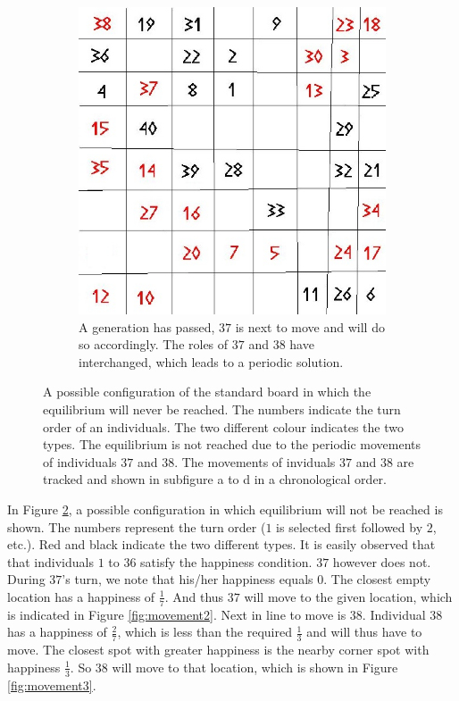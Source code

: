\begin{figure}[H]
\begin{subfigure}{0.3\textwidth}
        \includegraphics[width=\textwidth]{segregation_tegenvb_3.jpg}
        \caption{A generation has passed, $37$ is next to move and will do so accordingly. The roles of  $37$ and $38$ have interchanged, which leads to a periodic solution. }
        \label{fig:movement4}
    \end{subfigure}
    \caption{A possible configuration of the standard board in which the equilibrium will never be reached. The numbers indicate the turn order of an individuals. The two different colour indicates the two types. The equilibrium is not reached due to the periodic movements of individuals $37$ and $38$. The movements of inviduals $37$ and $38$ are tracked and shown in subfigure a to d in a chronological order.}\label{fig:equilibrium counterexample}
\end{figure}

In Figure \ref{fig:equilibrium counterexample}, a possible configuration in which  equilibrium will not be reached is shown. 
The numbers represent the turn order ($1$ is selected first followed by $2$, etc.). 
Red and black indicate  the two different types. It is easily observed that that individuals $1$ to $36$ satisfy the happiness condition. $37$ however does not. 
During $37$'s turn, we note that his/her happiness equals $0$. 
The closest empty location has a happiness of $\frac{1}{7}$. 
And thus $37$ will move to the given location, which is indicated in Figure \ref{fig:movement2}.
Next in line to move is $38$. 
Individual $38$ has a happiness of $\frac{2}{7}$, which is less than the required $\frac{1}{3}$ and will thus have to move. 
The closest spot with greater happiness is the nearby corner spot with happiness $\frac{1}{3}$. 
So $38$ will move to that location, which is shown in Figure \ref{fig:movement3}.\\

